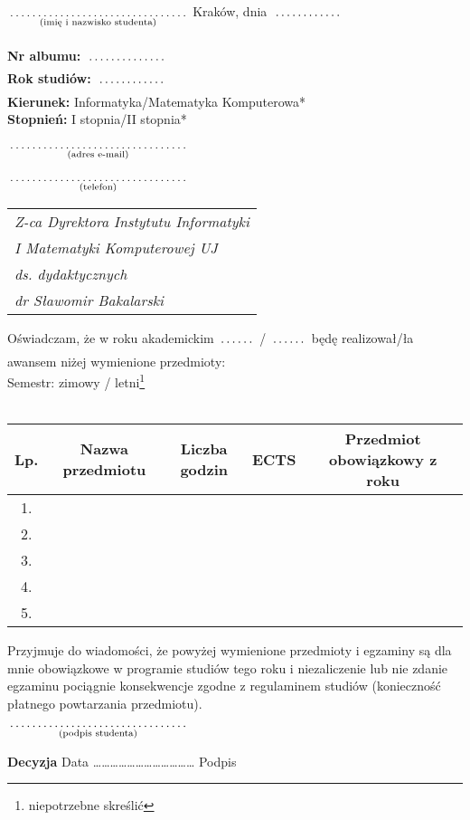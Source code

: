 \documentclass[a4paper,11pt]{article}
\newcommand{\fillField}[2]{
    $\underset{\text{#1}}{\parbox[t]{#2}{\dotfill}}$
}
\begin{document}
\noindent
\fillField{(imię i nazwisko studenta)}{5cm} \hfill Kraków, dnia \fillField{}{2cm} \\\\
\textbf{Nr albumu:}   \fillField{}{2.3cm}\\
\textbf{Rok studiów:} \fillField{}{2cm}\\
\textbf{Kierunek:} Informatyka/Matematyka Komputerowa*\\
\textbf{Stopnień:} I stopnia/II stopnia*\\\\
\fillField{(adres e-mail)}{5cm}\\\\
\fillField{(telefon)}{5cm}


\phantom{a}\hfill 
\begin{tabular}[c]{@{}l@{}}
\textit{Z-ca Dyrektora Instytutu Informatyki} \\
\textit{I Matematyki Komputerowej UJ}\\
\textit{ds. dydaktycznych}\\
\textit{dr Sławomir Bakalarski}
\end{tabular}

\vskip 1.5cm

\noindent
Oświadczam, że w roku akademickim \fillField{}{1cm}/\fillField{}{1cm} będę realizował/ła awansem niżej wymienione przedmioty:\\
Semestr: zimowy / letni\footnote[1]{niepotrzebne skreślić}\\\\


\noindent
\begin{tabular}{|c|c|c|c|c|}

    \hline
    \textbf{Lp.} & \textbf{Nazwa przedmiotu} \hspace{0.9cm} & \small{\textbf{Liczba godzin}} & \textbf{ECTS} & \small{\textbf{Przedmiot obowiązkowy z roku}} \\
    \hline
    1.  &   &   &  &\\ 
    \hline
    2.  &   &   &  &\\ 
    \hline
    3.  &   &   &  &\\ 
    \hline
    4.  &   &   &  &\\ 
    \hline
    5.  &   &   &  &\\ 
    \hline

\end{tabular}

\vskip 1.6cm

\noindent
Przyjmuje do wiadomości, że powyżej wymienione przedmioty i egzaminy są dla mnie obowiązkowe w programie studiów tego roku i niezaliczenie lub nie zdanie egzaminu pociągnie konsekwencje zgodne z regulaminem studiów (konieczność płatnego powtarzania przedmiotu).\\

\vskip 0.6cm

\hspace{\fill} \fillField{(podpis studenta)}{5cm} \hspace{2.0cm}
\vskip 1.0cm

\noindent
\textbf{Decyzja} \dotfill
\vskip 0.5cm
\noindent
Data ……………………………… Podpis \dotfill
\end{document}
